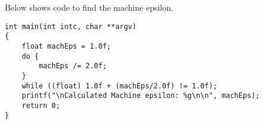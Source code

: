 Below shows code to find the machine epsilon. 

\begin{lstlisting}
int main(int intc, char **argv) 
{
    float machEps = 1.0f;
    do {
        machEps /= 2.0f;
    }
    while ((float) 1.0f + (machEps/2.0f) != 1.0f);
    printf("\nCalculated Machine epsilon: %g\n\n", machEps); 
    return 0;
}
\end{lstlisting}